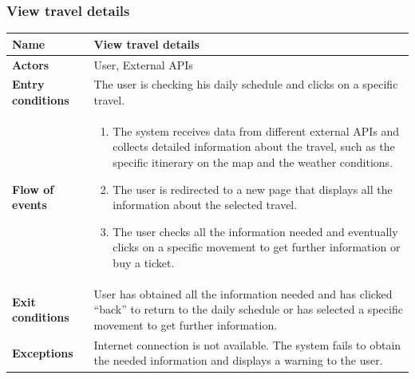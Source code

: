 \subsubsection{View travel details}
\begin{table}[!h]
	\centering
	{\renewcommand{\arraystretch}{2}%
		\begin{tabular}{|l|p{12cm}|}
			\hline
			\textbf{Name} 				& \textbf{View travel details} \\ \hline
			\textbf{Actors} 			& User, External APIs \\ \hline
			\textbf{Entry conditions} 	& The user is checking his daily schedule and clicks on a specific travel. \\ \hline
			\textbf{Flow of events}		& \begin{minipage}[t]{0.75\textwidth}
				\begin{enumerate}
					\item The system receives data from different external APIs and collects detailed information about the travel, such as the specific itinerary on the map and the weather conditions.
					\item The user is redirected to a new page that displays all the information about the selected travel.
					\item The user checks all the information needed and eventually clicks on a specific movement to get further information or buy a ticket.
				\end{enumerate}
			\end{minipage}	\\ \hline
			\textbf{Exit conditions}	& User has obtained all the information needed and has clicked “back” to return to the daily schedule or has selected a specific movement to get further information.  \\ \hline
			\textbf{Exceptions}			& Internet connection is not available. The system fails to obtain the needed information and displays a warning to the user.  \\ \hline
	\end{tabular}}
\end{table}

